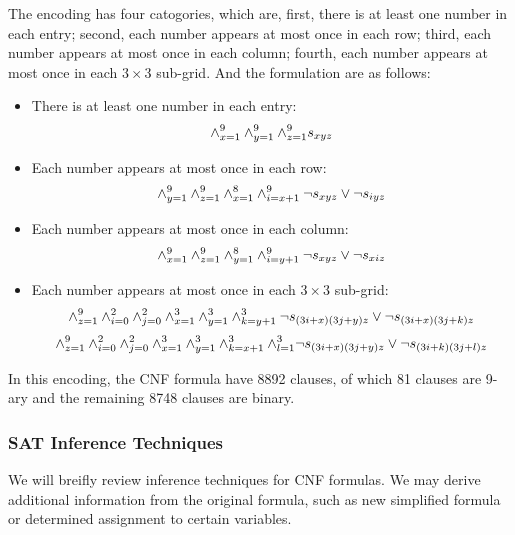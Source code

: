 \documentclass[11pt]{article}
\begin{document}
The encoding has four catogories, which are, first, there is at least one number in each entry; second, each number appears at most once in each row; third, each number appears at most once in each column; fourth, each number appears at most once in each $3 \times 3$ sub-grid. And the formulation are as follows:
\begin{itemize}
	\item There is at least one number in each entry: \\
		\begin{equation}
		\wedge_{x=1}^{9} \wedge_{y=1}^{9} \wedge_{z=1}^{9} s_{xyz}  \large
		\end{equation}
	
	\item Each number appears at most once in each row: \\
		\begin{equation}
		\wedge_{y=1}^{9} \wedge_{z=1}^{9} \wedge_{x=1}^{8} \wedge_{i=x+1}^{9} 
		\neg s_{xyz} \vee \neg s_{iyz} \large
		\end{equation}
		
	\item Each number appears at most once in each column: \\
		\begin{equation}
		\wedge_{x=1}^{9} \wedge_{z=1}^{9} \wedge_{y=1}^{8} \wedge_{i=y+1}^{9}
		\neg s_{xyz} \vee \neg s_{xiz}  \large
		\end{equation}
		
	\item Each number appears at most once in each $3 \times 3$ sub-grid: \\
		\begin{equation}
		\wedge_{z=1}^{9} \wedge_{i=0}^{2} \wedge_{j=0}^{2} \wedge_{x=1}^{3} \wedge_{y=1}^{3} \wedge_{k=y+1}^{3}
		\neg s_{(3i+x)(3j+y)z} \vee \neg s_{(3i+x)(3j+k)z} \large
		\end{equation}
		\begin{equation}
		\wedge_{z=1}^{9} \wedge_{i=0}^{2} \wedge_{j=0}^{2} \wedge_{x=1}^{3} \wedge_{y=1}^{3} 
		\wedge_{k=x+1}^{3} \wedge_{l=1}^{3}
		\neg s_{(3i+x)(3j+y)z} \vee \neg s_{(3i+k)(3j+l)z} \large
		\end{equation}
\end{itemize} 

In this encoding, the CNF formula have 8892 clauses, of which 81 clauses are 9-ary and the remaining 8748 clauses are binary.

\subsubsection{SAT Inference Techniques}
We will breifly review inference techniques for CNF formulas. We may derive additional information from the original formula, such as new simplified formula or determined assignment to certain variables.
\end{document}
